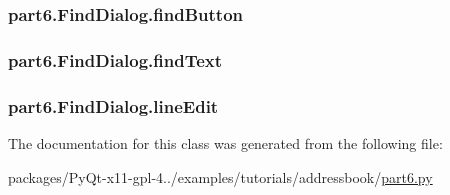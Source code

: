 \subsubsection[{find\+Button}]{\setlength{\rightskip}{0pt plus 5cm}part6.\+Find\+Dialog.\+find\+Button}\label{classpart6_1_1FindDialog_adb1ed29ee33b90aca1afdc46cea360ff}
\hypertarget{classpart6_1_1FindDialog_aa218912b8f376d6234fddeb772b76d6f}{}
\subsubsection[{find\+Text}]{\setlength{\rightskip}{0pt plus 5cm}part6.\+Find\+Dialog.\+find\+Text}\label{classpart6_1_1FindDialog_aa218912b8f376d6234fddeb772b76d6f}
\hypertarget{classpart6_1_1FindDialog_aadc750ff866f3c61440077338d178fef}{}
\subsubsection[{line\+Edit}]{\setlength{\rightskip}{0pt plus 5cm}part6.\+Find\+Dialog.\+line\+Edit}\label{classpart6_1_1FindDialog_aadc750ff866f3c61440077338d178fef}


The documentation for this class was generated from the following file\+:\begin{DoxyCompactItemize}
\item 
packages/\+Py\+Qt-\/x11-\/gpl-\/4../examples/tutorials/addressbook/\hyperlink{part6_8py}{part6.\+py}\end{DoxyCompactItemize}
